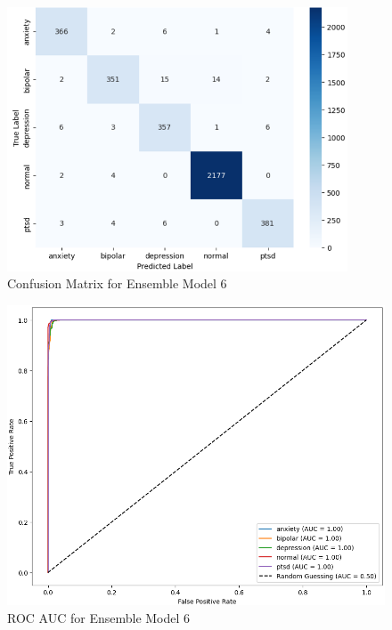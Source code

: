 \begin{figure}[h!]  
    \centering
    \includegraphics[width=0.9\textwidth]{Images/BLD CM.png}  
    \caption{Confusion Matrix for Ensemble Model 6}
    \label{dfdl1244883}  %
\end{figure}

\begin{figure}[h!]  
    \centering
    \includegraphics[width=1.0\textwidth]{Images/BLD ROC.png}  
    \caption{ROC AUC for Ensemble Model 6}
    \label{dfdl1244883}  %
\end{figure}

